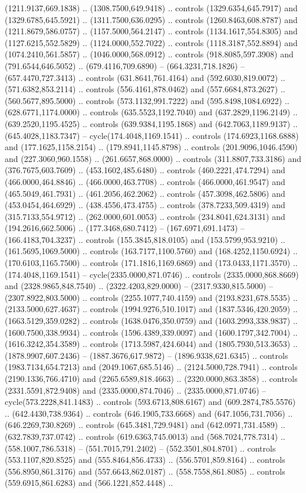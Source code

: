(1211.9137,669.1838) .. (1308.7500,649.9418) .. controls (1329.6354,645.7917) and (1329.6785,645.5921) .. (1311.7500,636.0295) .. controls (1260.8463,608.8787) and (1211.8679,586.0757) .. (1157.5000,564.2147) .. controls (1134.1617,554.8305) and (1127.6215,552.5829) .. (1124.0000,552.7022) .. controls (1118.3187,552.8894) and (1074.2410,561.5857) .. (1046.0000,568.0912) .. controls (918.8085,597.3908) and (791.6544,646.5052) .. (679.4116,709.6890) -- (664.3231,718.1826) -- (657.4470,727.3413) .. controls (631.8641,761.4164) and (592.6030,819.0072) .. (571.6382,853.2114) .. controls (556.4161,878.0462) and (557.6684,873.2627) .. (560.5677,895.5000) .. controls (573.1132,991.7222) and (595.8498,1084.6922) .. (628.6771,1174.0000) .. controls (635.5523,1192.7040) and (637.2829,1196.2149) .. (639.2520,1195.4525) .. controls (639.9384,1195.1868) and (642.7063,1189.9137) .. (645.4028,1183.7347) -- cycle(174.4048,1169.1541) .. controls (174.6923,1168.6888) and (177.1625,1158.2154) .. (179.8941,1145.8798) .. controls (201.9096,1046.4590) and (227.3060,960.1558) .. (261.6657,868.0000) .. controls (311.8807,733.3186) and (376.7675,603.7609) .. (453.1602,485.6480) .. controls (460.2221,474.7294) and (466.0000,464.8846) .. (466.0000,463.7708) .. controls (466.0000,461.9547) and (465.5049,461.7931) .. (461.2056,462.2062) .. controls (457.3098,462.5806) and (453.0454,464.6929) .. (438.4556,473.4755) .. controls (378.7233,509.4319) and (315.7133,554.9712) .. (262.0000,601.0053) .. controls (234.8041,624.3131) and (194.2616,662.5006) .. (177.3468,680.7412) -- (167.6971,691.1473) -- (166.4183,704.3237) .. controls (155.3845,818.0105) and (153.5799,953.9210) .. (161.5695,1069.5000) .. controls (163.7177,1100.5760) and (168.4252,1150.6924) .. (170.6103,1165.7500) .. controls (171.1816,1169.6869) and (173.0433,1171.3570) .. (174.4048,1169.1541) -- cycle(2335.0000,871.0746) .. controls (2335.0000,868.8669) and (2328.9865,848.7540) .. (2322.4203,829.0000) -- (2317.9330,815.5000) -- (2307.8922,803.5000) .. controls (2255.1077,740.4159) and (2193.8231,678.5535) .. (2133.5000,627.4637) .. controls (1994.9276,510.1017) and (1837.5346,420.2059) .. (1663.5129,359.0282) .. controls (1638.0476,350.0759) and (1603.2993,338.9837) .. (1600.7500,338.9934) .. controls (1596.4389,339.0097) and (1600.1797,342.7004) .. (1616.3242,354.3589) .. controls (1713.5987,424.6044) and (1805.7930,513.3653) .. (1878.9907,607.2436) -- (1887.3676,617.9872) -- (1896.9338,621.6345) .. controls (1983.7134,654.7213) and (2049.1067,685.5146) .. (2124.5000,728.7941) .. controls (2190.1336,766.4710) and (2265.6589,818.4663) .. (2320.0000,863.3858) .. controls (2331.5591,872.9408) and (2335.0000,874.7046) .. (2335.0000,871.0746) -- cycle(573.2228,841.1483) .. controls (593.6713,808.6167) and (609.2874,785.5576) .. (642.4430,738.9364) .. controls (646.1905,733.6668) and (647.1056,731.7056) .. (646.2269,730.8269) .. controls (645.3481,729.9481) and (642.0971,731.4589) .. (632.7839,737.0742) .. controls (619.6363,745.0013) and (568.7024,778.7314) .. (558.1007,786.5318) -- (551.7015,791.2402) -- (552.3501,804.8701) .. controls (553.1107,820.8525) and (555.8464,856.4733) .. (556.5701,859.8164) .. controls (556.8950,861.3176) and (557.6643,862.0187) .. (558.7558,861.8085) .. controls (559.6915,861.6283) and (566.1221,852.4448) .. 